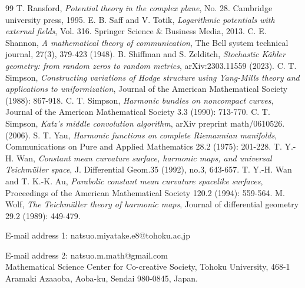 \documentclass[12pt]{article}
\theoremstyle{definition}
\begin{document}
\begin{thebibliography}{99}
 T. Ransford, {\it Potential theory in the complex plane}, No. 28. Cambridge university press, 1995.
 E. B. Saff and V. Totik, {\it Logarithmic potentials with external fields}, Vol. 316. Springer Science \& Business Media, 2013.
 C. E. Shannon, {\it A mathematical theory of communication}, The Bell system technical journal, 27(3), 379-423 (1948).
 B. Shiffman and S. Zelditch, {\it Stochastic K\" ahler geometry: from random zeros to random metrics}, arXiv:2303.11559 (2023).
 C. T. Simpson, {\it Constructing variations of Hodge structure using Yang-Mills theory and applications to uniformization}, Journal of the American Mathematical Society (1988): 867-918.
 C. T. Simpson, {\it Harmonic bundles on noncompact curves}, Journal of the American Mathematical Society 3.3 (1990): 713-770.
 C. T. Simpson, {\it Katz's middle convolution algorithm}, arXiv preprint math/0610526. (2006).
 S. T. Yau, {\it Harmonic functions on complete Riemannian manifolds}, Communications on Pure and Applied Mathematics 28.2 (1975): 201-228.
 T. Y.-H. Wan, {\it Constant mean curvature surface, harmonic maps, and universal Teichm\"uller space}, J. Differential Geom.35 (1992), no.3, 643-657.
 T. Y.-H. Wan and T. K.-K. Au, {\it Parabolic constant mean curvature spacelike surfaces}, Proceedings of the American Mathematical Society 120.2 (1994): 559-564.
 M. Wolf, {\it The Teichm\"uller theory of harmonic maps}, Journal of differential geometry 29.2 (1989): 449-479.
\end{thebibliography}

\noindent
E-mail address 1: natsuo.miyatake.e8@tohoku.ac.jp

\noindent
E-mail address 2: natsuo.m.math@gmail.com \\

\noindent
Mathematical Science Center for Co-creative Society, Tohoku University, 468-1 Aramaki Azaaoba, Aoba-ku, Sendai 980-0845, Japan.
\end{document}
